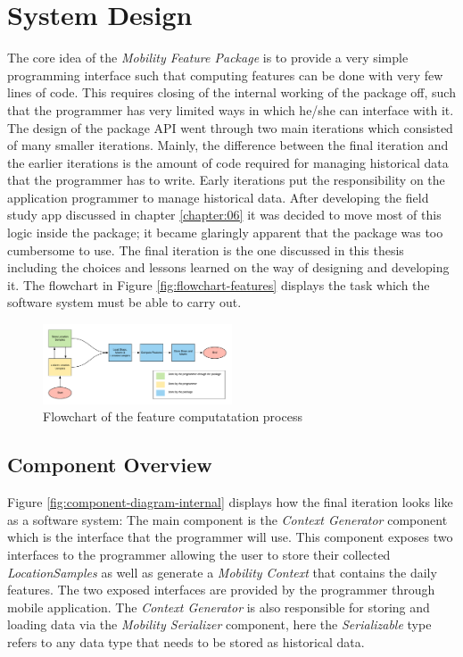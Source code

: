 \section{System Design}
The core idea of the \textit{Mobility Feature Package} is to provide a very simple programming interface such that computing features can be done with very few lines of code. This requires closing of the internal working of the package off, such that the programmer has very limited ways in which he/she can interface with it. The design of the package API went through two main iterations which consisted of many smaller iterations. Mainly, the difference between the final iteration and the earlier iterations is the amount of code required for managing historical data that the programmer has to write. Early iterations put the responsibility on the application programmer to manage historical data. After developing the field study app discussed in chapter \ref{chapter:06} it was decided to move most of this logic inside the package; it became glaringly apparent that the package was too cumbersome to use. The final iteration is the one discussed in this thesis including the choices and lessons learned on the way of designing and developing it. The flowchart in Figure \ref{fig:flowchart-features} displays the task which the software system must be able to carry out.

\begin{figure}
    \centering
    \includegraphics[width=0.5\textwidth]{images/diagrams/flowchart.pdf}
    \caption{Flowchart of the feature computatation process}
    \label{fig:my_label}
\end{figure}


\subsection{Component Overview}
Figure \ref{fig:component-diagram-internal} displays how the final iteration looks like as a software system: The main component is the \textit{Context Generator} component which is the interface that the programmer will use. This component exposes two interfaces to the programmer allowing the user to store their collected \textit{LocationSamples} as well as generate a \textit{Mobility Context} that contains the daily features. The two exposed interfaces are provided by the programmer through mobile application. The \textit{Context Generator} is also responsible for storing and loading data via the \textit{Mobility Serializer} component, here the \textit{Serializable} type refers to any data type that needs to be stored as historical data.

